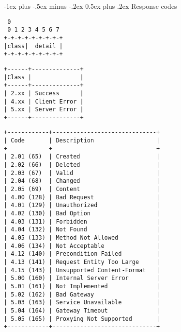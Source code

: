 \documentclass[10pt,landscape]{article}
\makeatletter
\renewcommand{\section}{\@startsection{section}{1}{0mm}%
                                {-1ex plus -.5ex minus -.2ex}%
                                {0.5ex plus .2ex}%
                                {\normalfont\large\bfseries}}
\makeatother
\begin{document}
\begin{multicols}{3}
\section{Response codes}

{\tiny
\begin{verbatim}
 0
 0 1 2 3 4 5 6 7
+-+-+-+-+-+-+-+-+
|class|  detail |
+-+-+-+-+-+-+-+-+
\end{verbatim}
}

{\tiny
\begin{verbatim}
+------+--------------+
|Class |              |
+------+--------------+
| 2.xx | Success      |
| 4.xx | Client Error |
| 5.xx | Server Error |
+------+--------------+
\end{verbatim}
}

{\tiny
\begin{verbatim}
+------------+------------------------------+
| Code       | Description                  |
+------------+------------------------------+
| 2.01 (65)  | Created                      |
| 2.02 (66)  | Deleted                      |
| 2.03 (67)  | Valid                        |
| 2.04 (68)  | Changed                      |
| 2.05 (69)  | Content                      |
| 4.00 (128) | Bad Request                  |
| 4.01 (129) | Unauthorized                 |
| 4.02 (130) | Bad Option                   |
| 4.03 (131) | Forbidden                    |
| 4.04 (132) | Not Found                    |
| 4.05 (133) | Method Not Allowed           |
| 4.06 (134) | Not Acceptable               |
| 4.12 (140) | Precondition Failed          |
| 4.13 (141) | Request Entity Too Large     |
| 4.15 (143) | Unsupported Content-Format   |
| 5.00 (160) | Internal Server Error        |
| 5.01 (161) | Not Implemented              |
| 5.02 (162) | Bad Gateway                  |
| 5.03 (163) | Service Unavailable          |
| 5.04 (164) | Gateway Timeout              |
| 5.05 (165) | Proxying Not Supported       |
+------------+------------------------------+
\end{verbatim}
}


\end{multicols}
\end{document}
